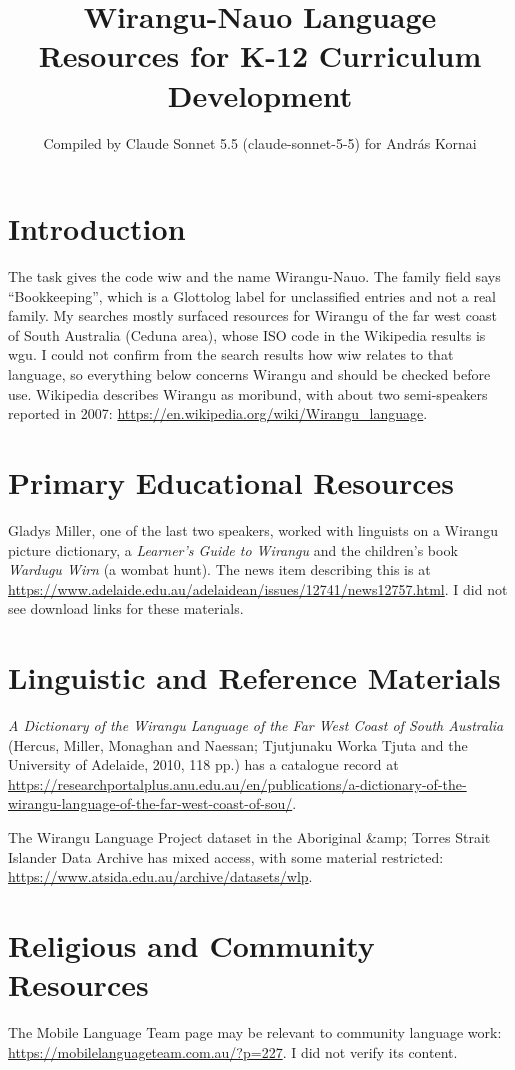 \documentclass[12pt]{article}
\title{Wirangu-Nauo Language Resources for K-12 Curriculum Development}
\author{Compiled by Claude Sonnet 5.5 (claude-sonnet-5-5) for Andr\'as Kornai}
\date{}
\begin{document}
\maketitle

\section{Introduction}
The task gives the code wiw and the name Wirangu-Nauo. The family field says ``Bookkeeping'', which is a Glottolog label for unclassified entries and not a real family. My searches mostly surfaced resources for Wirangu of the far west coast of South Australia (Ceduna area), whose ISO code in the Wikipedia results is wgu. I could not confirm from the search results how wiw relates to that language, so everything below concerns Wirangu and should be checked before use. Wikipedia describes Wirangu as moribund, with about two semi-speakers reported in 2007: \url{https://en.wikipedia.org/wiki/Wirangu_language}.

\section{Primary Educational Resources}
Gladys Miller, one of the last two speakers, worked with linguists on a Wirangu picture dictionary, a \emph{Learner's Guide to Wirangu} and the children's book \emph{Wardugu Wirn} (a wombat hunt). The news item describing this is at \url{https://www.adelaide.edu.au/adelaidean/issues/12741/news12757.html}. I did not see download links for these materials.

\section{Linguistic and Reference Materials}
\emph{A Dictionary of the Wirangu Language of the Far West Coast of South Australia} (Hercus, Miller, Monaghan and Naessan; Tjutjunaku Worka Tjuta and the University of Adelaide, 2010, 118 pp.) has a catalogue record at \url{https://researchportalplus.anu.edu.au/en/publications/a-dictionary-of-the-wirangu-language-of-the-far-west-coast-of-sou/}.

The Wirangu Language Project dataset in the Aboriginal \&amp; Torres Strait Islander Data Archive has mixed access, with some material restricted: \url{https://www.atsida.edu.au/archive/datasets/wlp}.

\section{Religious and Community Resources}
The Mobile Language Team page may be relevant to community language work: \url{https://mobilelanguageteam.com.au/?p=227}. I did not verify its content.
\end{document}

